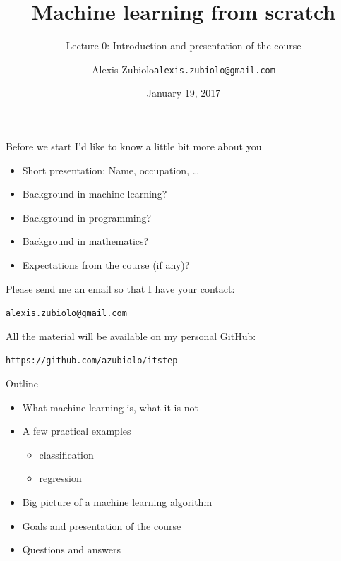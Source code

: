 \documentclass{beamer}
\title[Course presentation]{Machine learning from scratch}
\subtitle{Lecture 0: Introduction and presentation of the course}
\author{Alexis Zubiolo\newline\texttt{alexis.zubiolo@gmail.com}}
\institute{Data Science Team Lead @ Adcash}
\date{January 19, 2017}
\begin{document}
\begin{frame}
  \titlepage
\end{frame}

\begin{frame}{Before we start}
\vfill
I'd like to know a little bit more about you
\vfill
\begin{itemize}
	\item Short presentation: Name, occupation, \ldots
	\item Background in machine learning?
	\item Background in programming?
	\item Background in mathematics?
	\item Expectations from the course (if any)?
\end{itemize}
\vfill
Please send me an email so that I have your contact:
\vfill
\begin{center}
\texttt{alexis.zubiolo@gmail.com}
\end{center}
\vfill
All the material will be available on my personal GitHub:
\vfill
\begin{center}
\texttt{https://github.com/azubiolo/itstep}
\end{center}
\vfill
\end{frame}

\begin{frame}{Outline}
\vfill
\begin{itemize}
  \item What machine learning is, what it is not
\vfill
  \item A few practical examples
  \begin{itemize}
  	\item classification
  	\item regression
  \end{itemize}
\vfill
	\item Big picture of a machine learning algorithm
\vfill
  \item Goals and presentation of the course 
\vfill
  \item Questions and answers
\end{itemize}
\vfill

\end{frame}
\end{document}
